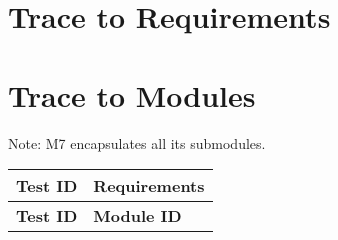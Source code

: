\documentclass[12pt, titlepage]{article}
\begin{document}
\section{Trace to Requirements}
		
\section{Trace to Modules}	
Note: M7 encapsulates all its submodules.
\begin{center}
    \begin{longtable}{|>{\centering\arraybackslash}p{4cm}|>{\centering\arraybackslash}p{10cm}|}
    \hline
    \textbf{Test ID} & \textbf{Requirements} \\
    \hline
    \endfirsthead
    
    \hline
    \textbf{Test ID} & \textbf{Module ID} \\
    \hline
    \endhead
    

\end{longtable}
\end{center}
\end{document}
